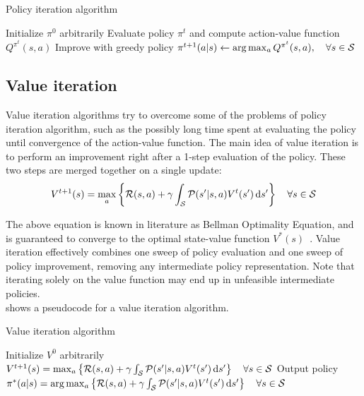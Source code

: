 \begin{algorithm}[t]
\caption[Policy iteration algorithm]{Policy iteration algorithm}\label{alg:policy-iteration}
\begin{algorithmic}
\State Initialize $\pi^0$ arbitrarily
\State Evaluate policy $\pi^t$ and compute action-value function $Q^{\pi^t}(s,a)$
\State Improve with greedy policy $\pi^{t+1}(a|s) \gets \arg\max_a{Q^{\pi^t}(s,a)},\quad\forall s\in\mathcal{S}$
\EndFor
\end{algorithmic}
\end{algorithm}

\subsection{Value iteration}
Value iteration algorithms try to overcome some of the problems of policy iteration algorithm, such as the possibly long time spent at evaluating the policy until convergence of the action-value function. The main idea of value iteration is to perform an improvement right after a 1-step evaluation of the policy. These two steps are merged together on a single update:
\[
V^{t+1}(s) = \max_a \left\{ \mathcal{R}(s,a) + \gamma\int_{\mathcal{S}} \mathcal{P}(s'|s,a)V^{t}(s')\, \textrm{d} s' \right\}\quad\forall s \in \mathcal{S}
\] 

The above equation is known in literature as Bellman Optimality Equation, and is guaranteed to converge to the optimal state-value function $V^*(s)$~\cite{BELLMAN1958228}. Value iteration effectively combines one sweep of policy evaluation and one sweep of policy improvement, removing any intermediate policy representation. Note that iterating solely on the value function may end up in unfeasible intermediate policies.\\
 shows a pseudocode for a value iteration algorithm.

\begin{algorithm}[t]
\caption{Value iteration algorithm}\label{alg:value-iteration}
\begin{algorithmic}
\State Initialize $V^0$ arbitrarily
\State $V^{t+1}(s) = \max_a \left\{ \mathcal{R}(s,a) + \gamma\int_{\mathcal{S}} \mathcal{P}(s'|s,a)V^{t}(s')\, \textrm{d} s' \right\}\quad\forall s \in \mathcal{S}$
\EndFor
\State Output policy $\pi^*(a|s)=\arg\max_a\left\{ \mathcal{R}(s,a) + \gamma\int_{\mathcal{S}}\mathcal{P}(s'|s,a)V^t(s') \, \textrm{d} s'\right\}\quad\forall s\in\mathcal{S}$
\end{algorithmic}
\end{algorithm}

